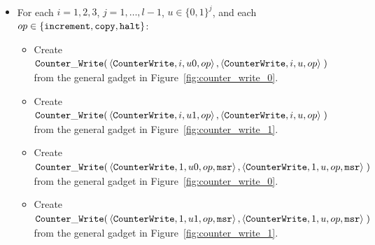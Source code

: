 \subsubsection{\cwrite}

\begin{itemize}

    \item For each $i = 1,2,3$,
                   $j = 1,\ldots,l-1$,
                   $u \in \{0, 1\}^j$, and each
                   $op \in \{ {\tt increment}, {\tt copy}, {\tt halt} \}$:
    \begin{itemize}
            \item Create
            $\begin{aligned}[t]
                {\tt Counter\_Write}(& \left\langle {\tt CounterWrite}, i, u0, op \right\rangle,
                          \left\langle {\tt CounterWrite}, i, u,  op \right\rangle \;)
            \end{aligned}$ \\ from the general gadget in Figure~\ref{fig:counter_write_0}.

            \item Create
            $\begin{aligned}[t]
                {\tt Counter\_Write}(& \left\langle {\tt CounterWrite}, i,  u1, op \right\rangle,
                          \left\langle {\tt CounterWrite}, i,  u,  op \right\rangle \;)
            \end{aligned}$ \\ from the general gadget in Figure~\ref{fig:counter_write_1}.

            \item Create
            $\begin{aligned}[t]
                {\tt Counter\_Write}(& \left\langle {\tt CounterWrite}, 1, u0, op, {\tt msr} \right\rangle,
                          \left\langle {\tt CounterWrite}, 1, u,  op, {\tt msr} \right\rangle \;)
            \end{aligned}$ \\ from the general gadget in Figure~\ref{fig:counter_write_0}.

            \item Create
            $\begin{aligned}[t]
                {\tt Counter\_Write}(& \left\langle {\tt CounterWrite}, 1,  u1, op, {\tt msr} \right\rangle,
                          \left\langle {\tt CounterWrite}, 1,  u,  op, {\tt msr} \right\rangle \;)
            \end{aligned}$ \\ from the general gadget in Figure~\ref{fig:counter_write_1}.


\end{itemize}
\end{itemize}
